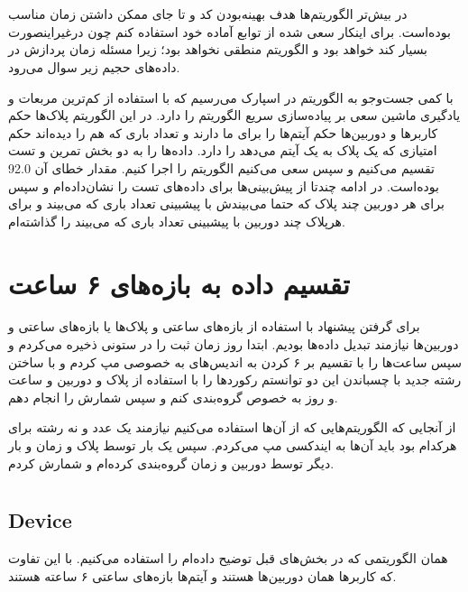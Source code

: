 \documentclass[12pt]{article}
\begin{document}
\section*{}
در بیش‌تر الگوریتم‌ها هدف بهینه‌بودن کد و تا جای ممکن داشتن زمان مناسب بوده‌است.
برای اینکار سعی شده از توابع آماده خود 
استفاده کنم چون درغیراینصورت بسیار کند خواهد بود و الگوریتم منطقی نخواهد بود؛ زیرا مسئله زمان پردازش در داده‌های حجیم زیر سوال می‌رود.

با کمی جست‌و‌جو به الگوریتم 
در اسپارک می‌رسیم که با استفاده از کم‌ترین مربعات و یادگیری ماشین سعی بر پیاده‌سازی سریع الگوریتم 
را دارد. در این الگوریتم پلاک‌ها حکم کاربر‌ها و 
دوربین‌ها حکم آیتم‌ها را برای ما دارند و تعداد باری که هم را دیده‌اند حکم امتیازی که یک پلاک به یک آیتم می‌دهد را دارد.
داده‌ها را به دو بخش تمرین و تست تقسیم می‌کنیم و سپس سعی می‌کنیم الگوریتم را اجرا کنیم.
مقدار خطای آن 92.0 بوده‌است. در ادامه چندتا از پیش‌بینی‌ها برای
داده‌های تست را نشان‌داده‌ام و سپس برای هر دوربین چند پلاک که حتما می‌بیندش با پیشبینی تعداد باری که می‌بیند و برای هر‌پلاک چند دوربین
با پیشبینی تعداد باری که می‌بیند را گذاشته‌ام.

\section*{تقسیم داده به بازه‌های ۶ ساعت}
برای گرفتن پیشنهاد با استفاده از بازه‌های ساعتی و پلاک‌ها یا بازه‌های ساعتی و دوربین‌ها نیازمند تبدیل داده‌ها بودیم.
ابتدا روز زمان ثبت را در ستونی ذخیره می‌کردم و سپس ساعت‌ها را با تقسیم بر ۶ کردن به اندیس‌های به خصوصی مپ کردم و با ساختن رشته جدید با چسباندن این دو توانستم رکورد‌ها را با استفاده از
پلاک و دوربین و ساعت و روز به خصوص گروه‌بندی کنم و سپس شمارش را انجام دهم.

از آنجایی که الگوریتم‌هایی که از آن‌ها استفاده می‌کنیم نیازمند یک عدد و نه رشته برای هرکدام بود باید آن‌ها به ایندکسی مپ می‌کردم.
سپس یک بار توسط پلاک و زمان و بار دیگر توسط دوربین و زمان گروه‌بندی کرده‌ام و شمارش کردم.

\section*{}
\subsection*{Device}
همان الگوریتمی که در بخش‌های قبل توضیح داده‌ام را استفاده می‌کنیم. با این
تفاوت که کاربر‌ها همان دوربین‌ها هستند و آیتم‌ها بازه‌های ساعتی ۶ ساعته هستند.
\end{document}

